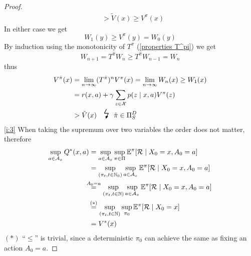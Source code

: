 \begin{proof}
\begin{align*}
		&> \tilde{V}(x) \ge V^\pi(x)
	\end{align*}
	In either case we get 
	\[ 
		W_1(y)\ge V^\pi(y)=W_0(y) 
	\]
	By induction using the monotonicity of \(T^\pi\) (\ref{properties T^pi}) we get 
	\[
		W_{n+1}=T^{\hat{\pi}}W_n \ge T^{\hat{\pi}}W_{n-1}=W_n
	\] 
	thus
	\begin{align*}
		V^{\hat{\pi}}(x)&=\lim_{n\to\infty}(T^{\hat{\pi}})^n V^\pi(x)=\lim_{n\to\infty} W_n(x)\ge W_1(x) \\
		&=r(x, a) + \gamma \sum_{z\in\cX} p(z \mid x, a) V^\pi(z) \\
		&> \tilde{V}(x) \contradiction{\hat{\pi}\in\detPolicy}
	\end{align*}
	\ref{i:3} When taking the supremum over two variables the order does not matter, therefore
	\begin{align}
		\sup_{a\in\cA_x} Q^*(x,a) 
		\nonumber
		&= \sup_{a\in\cA_x} \sup_{\pi\in\Pi}\E^\pi[\cR\mid X_0=x, A_0=a]
		\nonumber \\
		&=\sup_{(\pi_t,t\in\N_0)}\sup_{a\in\cA_x}\E^\pi[\cR\mid X_0=x, A_0=a]
		\nonumber\\
		&\lxeq{A_0=a}\sup_{(\pi_t,t\in\N)}\sup_{a\in\cA_x}\E^\pi[\cR\mid X_0=x, A_0=a]
		\nonumber\\
		&\lxeq{(*)}\sup_{(\pi_t,t\in\N)}\sup_{\pi_0}\E^\pi[\cR\mid X_0=x]
		\label{clarifiction:sup pi_0 = sup_a}\\
		&=V^*(x) \nonumber
	\end{align}
	\((*)\) ``\(\leq\)'' is trivial, since a deterministic \(\pi_0\) can achieve the same as fixing an action \(A_0=a\).


\end{proof}
